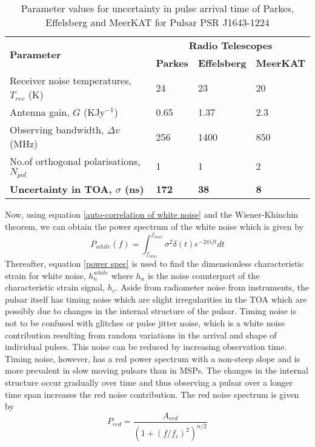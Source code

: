 \documentclass[12pt]{article}
\begin{document}
	\begin{table}[h!]
		\centering
		\begin{tabular}{|l|l|l|l|}
			\hline
			\multirow{2}{*}{\textbf{Parameter}} &
			\multicolumn{3}{c|}{\textbf{Radio Telescopes}}\\
			& \textbf{Parkes} & \textbf{Effelsberg} & \textbf{MeerKAT}\\
			\hline
			Receiver noise temperatures, $T_{rec}$ (K) & 24 & 23 & 20 \\
			\hline
			Antenna gain, $G$ (K{Jy}$^{-1}$) & 0.65 & 1.37 & 2.3 \\
			\hline
			Observing bandwidth, $\Delta{v}$ (MHz) & 256 & 1400 & 850 \\
			\hline
			No.of orthogonal polarisations, $N_{pol}$&1&1&2\\
			\hline
			\textbf{Uncertainty in TOA, $\sigma$ (ns)} & \textbf{172} & \textbf{38} & \textbf{8}\\
			\hline
		\end{tabular}
		\caption{\label{tab:noise2} Parameter values for uncertainty in pulse arrival time of Parkes, Effelsberg and MeerKAT for Pulsar PSR J1643-1224}
	\end{table}
	Now, using equation \ref{auto-correlation of white noise} and the Wiener-Khinchin theorem, we can obtain the power spectrum of the white noise which is given by
	\begin{equation}
	P_{white}(f)=\int_{f_{min}}^{f_{max}} \sigma^2 \delta(t)e^{-2 \pi i ft}dt
	\end{equation}
	Thereafter, equation \ref{power spec} is used to find the dimensionless characteristic strain for white noise, $h_{n}^{white}$ where $h_{n}$ is the noise counterpart of the characteristic strain signal, $h_{c}$. Aside from radiometer noise from instruments, the pulsar itself has timing noise which are slight irregularities in the TOA which are possibly due to changes in the internal structure of the pulsar. Timing noise is not to be confused with glitches or pulse jitter noise, which is a white noise contribution resulting from random variations in the arrival and shape of individual pulses. This noise can be reduced by increasing observation time. Timing noise, however, has a red power spectrum with a non-steep slope and is more prevalent in slow moving pulsars than in MSPs. The changes in the internal structure occur gradually over time and thus observing a pulsar over a longer time span increases the red noise contribution. The red noise spectrum is given by
	\begin{equation}
	P_{red}=\frac{A_{red}}{{(1+{(f/f_c)}^2)}^{\alpha/2}}
	\end{equation}
\end{document}
